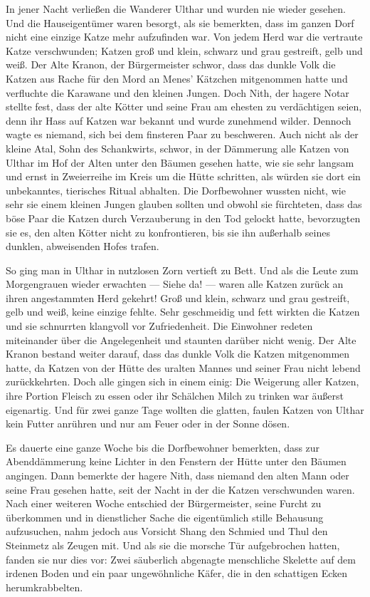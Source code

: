 \documentclass[a4paper]{memoir}
\begin{document}
In jener Nacht verließen die Wanderer Ulthar und wurden nie wieder gesehen. Und die Hauseigentümer waren besorgt, als sie bemerkten, dass im ganzen Dorf nicht eine einzige Katze mehr aufzufinden war. Von jedem Herd war die vertraute Katze verschwunden; Katzen groß und klein, schwarz und grau gestreift, gelb und weiß. Der Alte Kranon, der Bürgermeister schwor, dass das dunkle Volk die Katzen aus Rache für den Mord an Menes' Kätzchen mitgenommen hatte und verfluchte die Karawane und den kleinen Jungen. Doch Nith, der hagere Notar stellte fest, dass der alte Kötter und seine Frau am ehesten zu verdächtigen seien, denn ihr Hass auf Katzen war bekannt und wurde zunehmend wilder. Dennoch wagte es niemand, sich bei dem finsteren Paar zu beschweren. Auch nicht als der kleine Atal, Sohn des Schankwirts, schwor, in der Dämmerung alle Katzen von Ulthar im Hof der Alten unter den Bäumen gesehen hatte, wie sie sehr langsam und ernst in Zweierreihe im Kreis um die Hütte schritten, als würden sie dort ein unbekanntes, tierisches Ritual abhalten. Die Dorfbewohner wussten nicht, wie sehr sie einem kleinen Jungen glauben sollten und obwohl sie fürchteten, dass das böse Paar die Katzen durch Verzauberung in den Tod gelockt hatte, bevorzugten sie es, den alten Kötter nicht zu konfrontieren, bis sie ihn außerhalb seines dunklen, abweisenden Hofes trafen.

So ging man in Ulthar in nutzlosen Zorn vertieft zu Bett. Und als die Leute zum Morgengrauen wieder erwachten --- Siehe da! --- waren alle Katzen zurück an ihren angestammten Herd gekehrt! Groß und klein, schwarz und grau gestreift, gelb und weiß, keine einzige fehlte. Sehr geschmeidig und fett wirkten die Katzen und sie schnurrten klangvoll vor Zufriedenheit. Die Einwohner redeten miteinander über die Angelegenheit und staunten darüber nicht wenig. Der Alte Kranon bestand weiter darauf, dass das dunkle Volk die Katzen mitgenommen hatte, da Katzen von der Hütte des uralten Mannes und seiner Frau nicht lebend zurückkehrten. Doch alle gingen sich in einem einig: Die Weigerung aller Katzen, ihre Portion Fleisch zu essen oder ihr Schälchen Milch zu trinken war äußerst eigenartig. Und für zwei ganze Tage wollten die glatten, faulen Katzen von Ulthar kein Futter anrühren und nur am Feuer oder in der Sonne dösen.

Es dauerte eine ganze Woche bis die Dorfbewohner bemerkten, dass zur Abenddämmerung keine Lichter in den Fenstern der Hütte unter den Bäumen angingen. Dann bemerkte der hagere Nith, dass niemand den alten Mann oder seine Frau gesehen hatte, seit der Nacht in der die Katzen verschwunden waren. Nach einer weiteren Woche entschied der Bürgermeister, seine Furcht zu überkommen und in dienstlicher Sache die eigentümlich stille Behausung aufzusuchen, nahm jedoch aus Vorsicht Shang den Schmied und Thul den Steinmetz als Zeugen mit. Und als sie die morsche Tür aufgebrochen hatten, fanden sie nur dies vor: Zwei säuberlich abgenagte menschliche Skelette auf dem irdenen Boden und ein paar ungewöhnliche Käfer, die in den schattigen Ecken herumkrabbelten.
\end{document}
